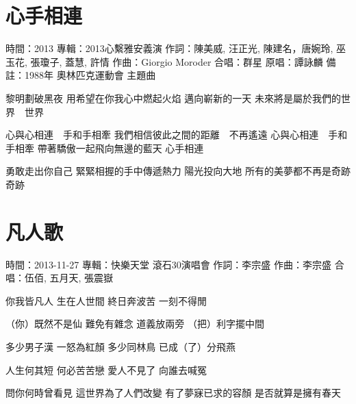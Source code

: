 \documentclass[UTF8,a4paper,oneside,twocolumn,12pt]{ctexbook}
\newcommand{\infopair}[2]{\textbullet #1：#2}
\newcommand{\zc}[1][伍佰]{\infopair{作詞}{#1}}
\newcommand{\zq}[1][伍佰]{\infopair{作曲}{#1}}
\newcommand{\zj}[1]{\infopair{專輯}{#1}}
\newcommand{\yc}[1]{\infopair{原唱}{#1}}
\newcommand{\sj}[1]{\infopair{時間}{#1}}
\newcommand{\bz}[1]{\infopair{備註}{#1}}
\newenvironment{info}{\begin{flushleft}\kaishu
	}
	{\end{flushleft}\normalsize\yahei\par}
\newenvironment{lyric}{
	}
{}
\begin{document}
\section{心手相連}
\begin{info}
	\sj{2013}
	\zj{2013心繫雅安義演}
	\zc[陳美威, 汪正光, 陳建名，唐婉玲, 巫玉花, 張瓊子, 蓋慧, 許情]
	\zq[Giorgio Moroder]
	\infopair{合唱}{群星}
	\yc{譚詠麟}
	\bz{1988年 奧林匹克運動會 主題曲}
\end{info}
\begin{lyric}
	黎明劃破黑夜
	用希望在你我心中燃起火焰
	邁向嶄新的一天
	未來將是屬於我們的世界　世界

	心與心相連　手和手相牽
	我們相信彼此之間的距離　不再遙遠
	心與心相連　手和手相牽
	帶著驕傲一起飛向無邊的藍天
	心手相連

	勇敢走出你自己
	緊緊相握的手中傳遞熱力
	陽光投向大地
	所有的美夢都不再是奇跡　奇跡
\end{lyric}

\section{凡人歌}
\begin{info}
	\sj{2013-11-27}
	\zj{快樂天堂 滾石30演唱會}
	\zc[李宗盛]
	\zq[李宗盛]
	\infopair{合唱}{伍佰, 五月天, 張震嶽}
\end{info}
\begin{lyric}
	你我皆凡人  生在人世間
	終日奔波苦  一刻不得閒

	（你）既然不是仙  難免有雜念
	道義放兩旁  （把）利字擺中間

	多少男子漢  一怒為紅顏
	多少同林鳥  已成（了）分飛燕

	人生何其短  何必苦苦戀
	愛人不見了  向誰去喊冤

	問你何時曾看見  這世界為了人們改變
	有了夢寐已求的容顏  是否就算是擁有春天
\end{lyric}
\end{document}
